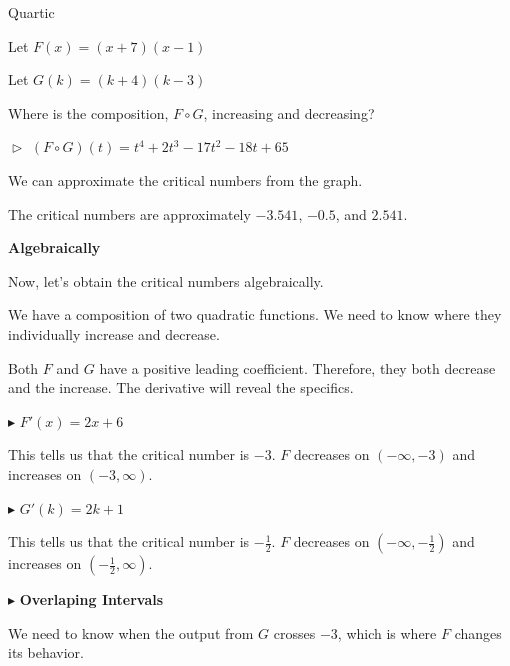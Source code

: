 \documentclass{ximera}
\begin{document}
\begin{example}   Quartic



Let $F(x) = (x+7)(x-1)$ 


Let $G(k) = (k+4)(k-3)$ 



Where is the composition, $F \circ G$, increasing and decreasing?


$\vartriangleright$   $(F \circ G)(t) = t^4 +2 t^3 -17 t^2 - 18 t + 65$





We can approximate the critical numbers from the graph.



\begin{center}
\end{center}


The critical numbers are approximately $-3.541$, $-0.5$, and $2.541$.


\textbf{\textcolor{red!70!black}{Algebraically}}


Now, let's obtain the critical numbers algebraically. 


We have a composition of two quadratic functions.  We need to know where they individually increase and decrease.

Both $F$ and $G$ have a positive leading coefficient.  Therefore, they both decrease and the increase. The derivative will reveal the specifics.



$\blacktriangleright$  $F'(x) = 2x + 6$

This tells us that the critical number is $-3$.  $F$ decreases on $(-\infty, -3)$ and increases on $(-3, \infty)$.

$\blacktriangleright$  $G'(k) = 2k + 1$

This tells us that the critical number is $-\frac{1}{2}$.  $F$ decreases on $(-\infty, -\frac{1}{2})$ and increases on $(-\frac{1}{2}, \infty)$.







\textbf{\textcolor{red!70!darkgray}{$\blacktriangleright$}} \textbf{\textcolor{purple!85!blue}{Overlaping Intervals}}  



We need to know when the output from $G$ crosses $-3$, which is where $F$ changes its behavior.






\end{example}
\end{document}

